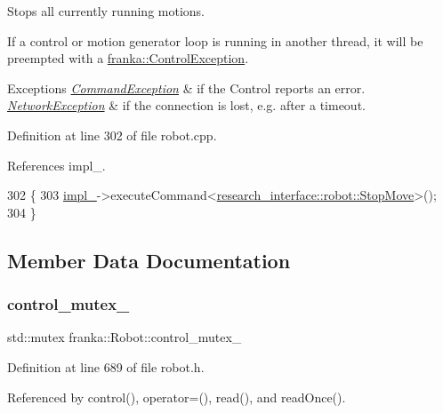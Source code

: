 Stops all currently running motions.

If a control or motion generator loop is running in another thread, it will be preempted with a \hyperlink{structfranka_1_1ControlException}{franka\+::\+Control\+Exception}.


\begin{DoxyExceptions}{Exceptions}
{\em \hyperlink{structfranka_1_1CommandException}{Command\+Exception}} & if the Control reports an error. \\
\hline
{\em \hyperlink{structfranka_1_1NetworkException}{Network\+Exception}} & if the connection is lost, e.\+g. after a timeout. \\
\hline
\end{DoxyExceptions}


Definition at line 302 of file robot.\+cpp.



References impl\+\_\+.


\begin{DoxyCode}
302                  \{
303   \hyperlink{classfranka_1_1Robot_aca155054184e5b6478942fd6a1b82ba4}{impl\_}->executeCommand<\hyperlink{structresearch__interface_1_1robot_1_1StopMove}{research\_interface::robot::StopMove}>();
304 \}
\end{DoxyCode}


\subsection{Member Data Documentation}
\mbox{\label{classfranka_1_1Robot_a719ad1fab76f8edfc9f6f761671c1375}} 
\subsubsection{\texorpdfstring{control\+\_\+mutex\+\_\+}{control\_mutex\_}}
{\footnotesize\ttfamily std\+::mutex franka\+::\+Robot\+::control\+\_\+mutex\+\_\+\hspace{0.3cm}{\ttfamily [private]}}



Definition at line 689 of file robot.\+h.



Referenced by control(), operator=(), read(), and read\+Once().

